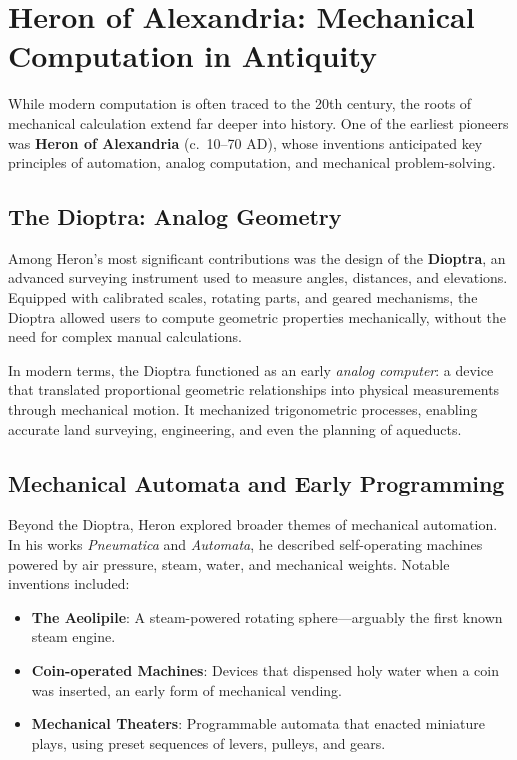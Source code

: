 \section{Heron of Alexandria: Mechanical Computation in Antiquity}

While modern computation is often traced to the 20th century, the roots of mechanical calculation extend far deeper into history. One of the earliest pioneers was \textbf{Heron of Alexandria} (c.~10--70 AD), whose inventions anticipated key principles of automation, analog computation, and mechanical problem-solving.

\subsection{The Dioptra: Analog Geometry}

Among Heron's most significant contributions was the design of the \textbf{Dioptra}, an advanced surveying instrument used to measure angles, distances, and elevations. Equipped with calibrated scales, rotating parts, and geared mechanisms, the Dioptra allowed users to compute geometric properties mechanically, without the need for complex manual calculations.

In modern terms, the Dioptra functioned as an early \textit{analog computer}: a device that translated proportional geometric relationships into physical measurements through mechanical motion. It mechanized trigonometric processes, enabling accurate land surveying, engineering, and even the planning of aqueducts.

\subsection{Mechanical Automata and Early Programming}

Beyond the Dioptra, Heron explored broader themes of mechanical automation. In his works \textit{Pneumatica} and \textit{Automata}, he described self-operating machines powered by air pressure, steam, water, and mechanical weights. Notable inventions included:

\begin{itemize}
    \item \textbf{The Aeolipile}: A steam-powered rotating sphere---arguably the first known steam engine.
    \item \textbf{Coin-operated Machines}: Devices that dispensed holy water when a coin was inserted, an early form of mechanical vending.
    \item \textbf{Mechanical Theaters}: Programmable automata that enacted miniature plays, using preset sequences of levers, pulleys, and gears.
\end{itemize}


